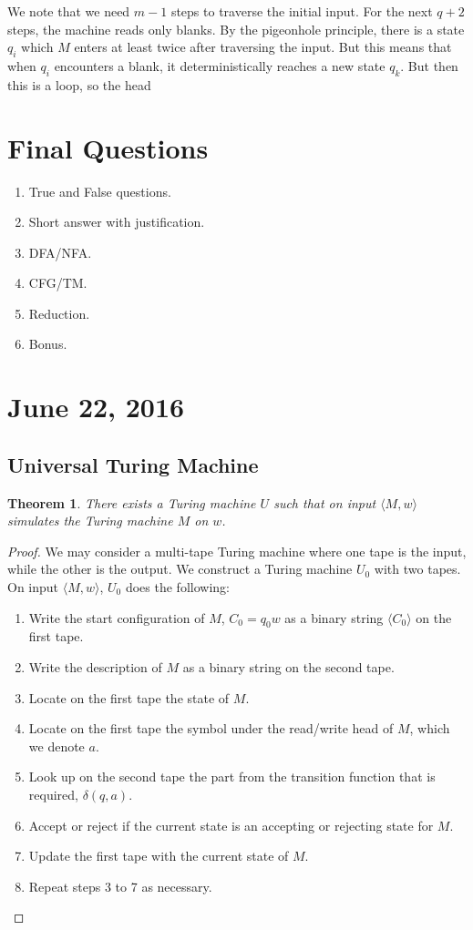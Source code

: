 \documentclass[11pt]{article}
\theoremstyle{plain} %
\newtheorem*{theorem}{Theorem}
\theoremstyle{definition}
\theoremstyle{example}
\theoremstyle{remark}
\begin{document}
We note that we need $m-1$ steps to traverse the initial input. For the next $q+2$ steps, the machine reads only blanks. By the pigeonhole principle, there is a state $q_i$ which $M$ enters at least twice after traversing the input. But this means that when $q_i$ encounters a blank, it deterministically reaches a new state $q_k$. But then this is a loop, so the head 

\section{Final Questions}

\begin{enumerate}
	\item True and False questions.
	\item Short answer with justification.
	\item DFA/NFA.
	\item CFG/TM.
	\item Reduction.
	\item Bonus.
\end{enumerate}

\section{June 22, 2016}
\subsection{Universal Turing Machine}

\begin{theorem}
There exists a Turing machine $U$ such that on input $\langle M, w \rangle$ simulates the Turing machine $M$ on $w$.
\end{theorem}

\begin{proof}
We may consider a multi-tape Turing machine where one tape is the input, while the other is the output. We construct a Turing machine $U_0$ with two tapes. On input $\langle M, w \rangle$, $U_0$ does the following:
	\begin{enumerate}
		\item Write the start configuration of $M$, $C_0 = q_0w$ as a binary string $\langle C_0 \rangle$ on the first tape. 
		\item Write the description of $M$ as a binary string on the second tape. 
		\item Locate on the first tape the state of $M$.
		\item Locate on the first tape the symbol under the read/write head of $M$, which we denote $a$.
		\item Look up on the second tape the part from the transition function that is required, $\delta(q,a)$. 
		\item Accept or reject if the current state is an accepting or rejecting state for $M$.
		\item Update the first tape with the current state of $M$.
		\item Repeat steps 3 to 7 as necessary.
	\end{enumerate}
\end{proof}
\end{document}
